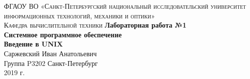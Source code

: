 \begin{titlepage}
\begin{center}

\textsc{ФГАОУ ВО «Санкт-Петербургский национальный исследовательский университет информационных технологий, механики и оптики»\\[4mm]
Кафедра вычислительной техники}
\vfill
\textbf{Лабораторная работа №1\\[4mm]
Системное программное обеспечение\\[4mm]
Введение в UNIX\\[16mm]
}
Саржевский Иван Анатольевич
\\[2mm]Группа P3202
\vfill
Санкт-Петербург\\[2mm]
2019 г.

\end{center}
\end{titlepage}
